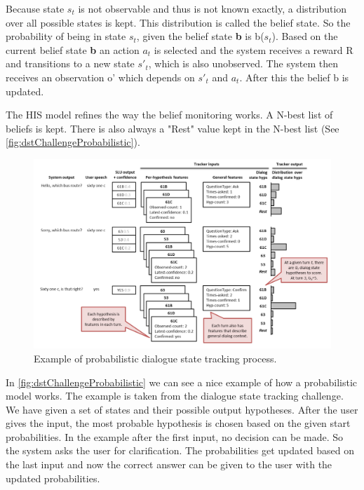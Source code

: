 \documentclass[conference]{IEEEtran}
\begin{document}
Because state $s_{t}$ is not observable and thus is not known exactly, a distribution over all possible states is kept. This distribution is called the belief state. So the probability of being in state $s_{t}$, given the belief state \textbf{b} is b($s_{t}$)\cite{young2007hidden}. 
Based on the current belief state \textbf{b} an action $a_{t}$ is selected and the system receives  a reward R and transitions to a new state $s'_{t}$, which is also unobserved. The system then receives an observation o' which depends on $s'_{t}$ and $a_{t}$. After this the belief b is updated\cite{young2007hidden,young2013pomdp}.


The HIS model refines the way the belief monitoring works. A N-best list of beliefs is kept. There is also always a "Rest" value kept in the N-best list (See \autoref{fig:dstChallengeProbabilistic})\cite{young2007hidden}.

\begin{figure}[H]
\centering
   \includegraphics[width=\linewidth]{dstChallangeProbabilistic.jpg}
  \caption{Example of probabilistic dialogue state tracking process\cite{williams2013dialog}.}
  \label{fig:dstChallengeProbabilistic}
\end{figure}

In \autoref{fig:dstChallengeProbabilistic} we can see a nice example of how a probabilistic model works. The example is taken from the dialogue state tracking challenge\cite{williams2013dialog}. We have given a set of states and their possible output hypotheses.
After the user gives the input, the most probable hypothesis is chosen based on the given start probabilities. In the example after the first input, no decision can be made. So the system asks the user for clarification. The probabilities get updated based on the last input and now the correct answer can be given to the user with the updated probabilities. 
\end{document}
